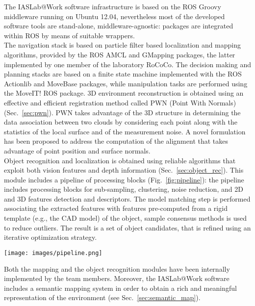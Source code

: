 \documentclass[conference]{IEEEtran}
\begin{document}
The IASLab@Work software infrastructure is based on the ROS Groovy middleware running on Ubuntu 12.04, nevertheless most of the developed software tools are stand-alone, middleware-agnostic: packages are integrated within ROS by means of suitable wrappers.\\
The navigation stack is based on particle filter based localization and mapping algorithms, provided by the ROS AMCL and GMapping packages, the latter implemented by one member of the laboratory RoCoCo. The decision making and planning stacks are based on a finite state machine implemented with the ROS Actionlib and MoveBase packages, while manipulation tasks are performed using the MoveIT! ROS package.
3D environment reconstruction is obtained using an effective and efficient registration method called PWN (Point With Normals) (Sec.~\ref{sec:pwn}). 
PWN takes advantage of the 3D structure in determining the data association between two clouds by considering each point along with the statistics of the local surface and of the measurement noise. A novel formulation has been proposed to address the computation of the alignment that takes advantage of point position and surface normals.\\

Object recognition and localization is obtained using reliable algorithms that exploit both vision features and depth information (Sec.~\ref{sec:object_rec}). This module includes a pipeline of processing blocks (Fig.~\ref{fig:pipeline}): the pipeline includes processing blocks for sub-sampling, clustering, noise reduction, and 2D and 3D features detection and descriptors. The model matching step is performed associating the extracted features with features pre-computed from a rigid template (e.g., the CAD model) of the object, sample consensus methods is used to reduce outliers. The result is a set of object candidates, that is refined using an iterative optimization strategy. 

\begin{figure*}[t!]
\begin{center}
\texttt{[image: images/pipeline.png]}
\end{center}
\caption{The IASLab@Work object recognition and localization pipeline.}\label{fig:pipeline}
\end{figure*}

Both the mapping and the object recognition modules have been internally implemented by the team members.
Moreover, the IASLab@Work software includes a semantic mapping system in order to obtain a rich and meaningful representation of the environment (see Sec.~\ref{sec:semantic_map}).\\
\end{document}
